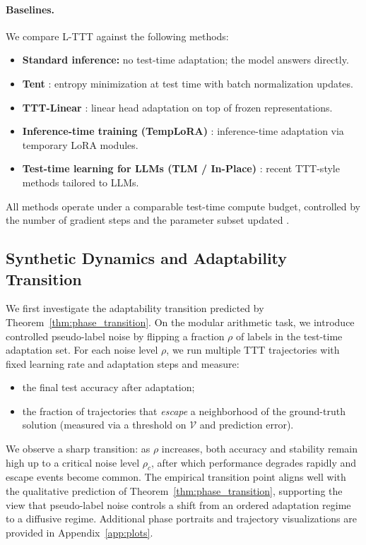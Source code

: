 \documentclass{article}
\theoremstyle{plain}
\theoremstyle{definition}
\theoremstyle{remark}
\newcommand{\Lyap}{\mathcal{V}}            %
\begin{document}
\paragraph{Baselines.}
We compare L-TTT against the following methods:
\begin{itemize}
    \item \textbf{Standard inference:} no test-time adaptation; the model answers directly.
    \item \textbf{Tent} \cite{wang2021tent}: entropy minimization at test time with batch normalization updates.
    \item \textbf{TTT-Linear} \cite{sun2023learning}: linear head adaptation on top of frozen representations.
    \item \textbf{Inference-time training (TempLoRA)} \cite{templora2024}: inference-time adaptation via temporary LoRA modules.
    \item \textbf{Test-time learning for LLMs (TLM / In-Place)} \cite{tlm2025,inplacettt2025}: recent TTT-style methods tailored to LLMs.
\end{itemize}
All methods operate under a comparable test-time compute budget, controlled by the number of gradient steps and the parameter subset updated \cite{snell2024scaling,ttcompute2025}.

\subsection{Synthetic Dynamics and Adaptability Transition}

We first investigate the adaptability transition predicted by Theorem~\ref{thm:phase_transition}. On the modular arithmetic task, we introduce controlled pseudo-label noise by flipping a fraction $\rho$ of labels in the test-time adaptation set. For each noise level $\rho$, we run multiple TTT trajectories with fixed learning rate and adaptation steps and measure:

\begin{itemize}
    \item the final test accuracy after adaptation;
    \item the fraction of trajectories that \emph{escape} a neighborhood of the ground-truth solution (measured via a threshold on $\Lyap$ and prediction error).
\end{itemize}

We observe a sharp transition: as $\rho$ increases, both accuracy and stability remain high up to a critical noise level $\rho_c$, after which performance degrades rapidly and escape events become common. The empirical transition point aligns well with the qualitative prediction of Theorem~\ref{thm:phase_transition}, supporting the view that pseudo-label noise controls a shift from an ordered adaptation regime to a diffusive regime. Additional phase portraits and trajectory visualizations are provided in Appendix~\ref{app:plots}.
\end{document}
